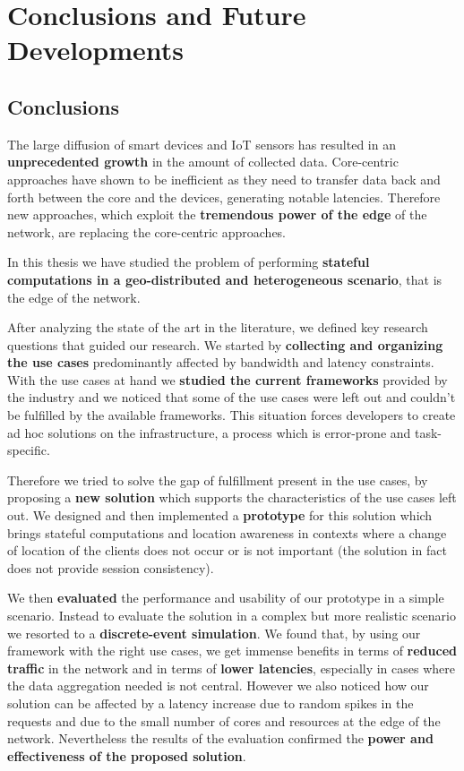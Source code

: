 \chapter{Conclusions and Future Developments}
\label{ch:conclusions}


\section{Conclusions}
The large diffusion of smart devices and IoT sensors has resulted in an \textbf{unprecedented growth} in the amount of collected data. Core-centric approaches have shown to be inefficient as they need to transfer data back and forth between the core and the devices, generating notable latencies. Therefore new approaches, which exploit the \textbf{tremendous power of the edge} of the network, are replacing the core-centric approaches.

In this thesis we have studied the problem of performing \textbf{stateful computations in a geo-distributed and heterogeneous scenario}, that is the edge of the network.

After analyzing the state of the art in the literature, we defined key research questions that guided our research.
We started by \textbf{collecting and organizing the use cases} predominantly affected by bandwidth and latency constraints. With the use cases at hand we \textbf{studied the current frameworks} provided by the industry and we noticed that some of the use cases were left out and couldn't be fulfilled by the available frameworks. This situation forces developers to create ad hoc solutions on the infrastructure, a process which is error-prone and task-specific.

Therefore we tried to solve the gap of fulfillment present in the use cases, by proposing a \textbf{new solution} which supports the characteristics of the use cases left out. We designed and then implemented a \textbf{prototype} for this solution which brings stateful computations and location awareness in contexts where a change of location of the clients does not occur or is not important (the solution in fact does not provide session consistency).

We then \textbf{evaluated} the performance and usability of our prototype in a simple scenario. Instead to evaluate the solution in a complex but more realistic scenario we resorted to a \textbf{discrete-event simulation}.
We found that, by using our framework with the right use cases, we get immense benefits in terms of \textbf{reduced traffic} in the network and in terms of \textbf{lower latencies}, especially in cases where the data aggregation needed is not central. However we also noticed how our solution can be affected by a latency increase due to random spikes in the requests and due to the small number of cores and resources at the edge of the network. Nevertheless the results of the evaluation confirmed the \textbf{power and effectiveness of the proposed solution}.


